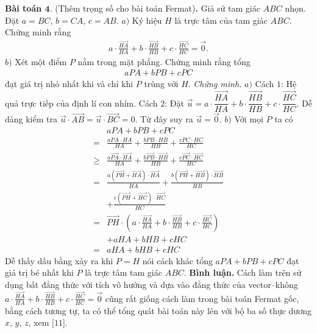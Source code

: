 \begin{multicols}{2}
	\vskip 0.1cm
	\textbf{\color{cackithi}Bài toán $\pmb{4.}$} (Thêm trọng số cho bài toán Fermat)\textbf{\color{cackithi}.} Giả sử tam giác $ABC$ nhọn. Đặt $a=BC$, $b=CA$, $c=AB$.
	\vskip 0.1cm
	$a)$ Ký hiệu $H$ là trực tâm của tam giác $ABC$. Chứng minh rằng 
	\begin{align*}
		a\cdot\frac{\overrightarrow{HA}}{HA}+b\cdot\frac{\overrightarrow{HB}}{HB}+c\cdot\frac{\overrightarrow{HC}}{HC}=\overrightarrow{0}.
	\end{align*}
	$b)$ Xét một điểm $P$ nằm trong mặt phẳng. Chứng minh rằng tổng
	\begin{align*}
		aPA+bPB+cPC
	\end{align*} 
	đạt giá trị nhỏ nhất khi và chỉ khi $P$ trùng với $H$.
	\vskip 0.1cm
	\textit{Chứng minh.}	
		$a)$ Cách $1$: Hệ quả trực tiếp của định lí con nhím.
		\vskip 0.1cm
		Cách $2$: Đặt  $\overrightarrow{u}=a\cdot\dfrac{\overrightarrow{HA}}{HA}+b\cdot\dfrac{\overrightarrow{HB}}{HB}+c\cdot\dfrac{\overrightarrow{HC}}{HC}.$
		Dễ dàng kiểm tra $\overrightarrow{u}\cdot\overrightarrow{AB}=\overrightarrow{u}\cdot\overrightarrow{BC}=0$. Từ đây suy ra $\overrightarrow{u}=\overrightarrow{0}.$
		\vskip 0.1cm
		$b)$ Với mọi $P$ ta có
		\begin{align*}
			&aPA+bPB+cPC\\
			=&\frac{aPA\cdot HA}{HA}+\frac{bPB\cdot HB}{HB}+\frac{cPC\cdot HC}{HC}\\
			\ge&\frac{a\overrightarrow{PA}\cdot \overrightarrow{HA}}{HA}+\frac{b\overrightarrow{PB}\cdot \overrightarrow{HB}}{HB}+\frac{c\overrightarrow{PC}\cdot \overrightarrow{HC}}{HC}\\
			=&\frac{a(\overrightarrow{PH}+\overrightarrow{HA})\cdot \overrightarrow{HA}}{HA}+\frac{b(\overrightarrow{PH}+\overrightarrow{HB})\cdot \overrightarrow{HB}}{HB}\\
			&+\frac{c(\overrightarrow{PH}+\overrightarrow{HC})\cdot \overrightarrow{HC}}{HC}\\
			=&\overrightarrow{PH}\cdot\left(a\cdot\frac{\overrightarrow{HA}}{HA}+b\cdot\frac{\overrightarrow{HB}}{HB}+c\cdot\frac{\overrightarrow{HC}}{HC}\right)\\
			&+aHA+bHB+cHC\\
			=&aHA+bHB+cHC
		\end{align*}
		Dễ thấy dấu bằng xảy ra khi $P=H$ nói cách khác tổng $aPA+bPB+cPC$ đạt giá trị bé nhất khi $P$ là trực tâm tam giác $ABC$.
	\vskip 0.1cm
	{\bf\color{cackithi} Bình luận.} Cách làm trên sử dụng bất đẳng thức với tích vô hướng và dựa vào đẳng thức của vector--không $a\!\cdot\!\frac{\overrightarrow{HA}}{HA}\!+\!b\!\cdot\!\frac{\overrightarrow{HB}}{HB}\!+\!c\!\cdot\!\frac{\overrightarrow{HC}}{HC}\!=\!\overrightarrow{0}$ cũng rất giống cách làm trong bài toán Fermat gốc, bằng cách tương tự, ta có thể tổng quát bài toán này lên với bộ ba số thực dương $x$, $y$, $z$, xem [$11$].

\end{multicols}
